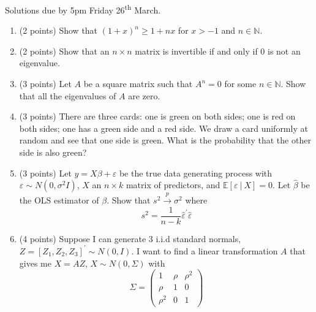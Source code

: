 \documentclass[12pt]{article}
\newif\ifsln
\newcommand{\N}{\mathbb{N}}
\renewcommand{\epsilon}{\varepsilon}
\newcommand{\E}{\mathbb{E}}
\begin{document}
\pagestyle{fancyplain}


\chead{\textbf{Take-home Problem Set \#2 \ifsln Solutions \fi}}

\begin{center}
Solutions due by 5pm Friday 26\textsuperscript{th} March.
\end{center}

\begin{enumerate}[1.]
\setlength\itemsep{5mm}
\item (2 points) Show that $(1 + x)^{n} \geq 1 + nx$ for $x> -1$ and $n \in \N$.

\item (2 points) Show that an $n \times n$ matrix is invertible if and only if 0 is not an eigenvalue.


\item (3 points) Let $A$ be a square matrix such that $A^{n} = 0$ for some $n \in \N$. Show that all the eigenvalues of $A$ are zero.
\item (3 points) There are three cards: one is green on both sides; one is red on both sides; one has a green side and a red side. We draw a card uniformly at random and see that one side is green. What is the probability that the other side is also green?


\item (3 points) Let $y = X\beta + \epsilon$ be the true data generating process with $\epsilon \sim N(0, \sigma^{2}I)$, $X$ an $n\times k$ matrix of predictors, and $\E[\epsilon \ | \ X] = 0$. Let $\hat{\beta}$ be the OLS estimator of $\beta$. Show that $s^2 \overset{p}{\to} \sigma^{2}$ where
\[s^{2} = \frac{1}{n-k} \hat{\epsilon}^{\prime}\hat{\epsilon}\]


\item (4 points) Suppose I can generate 3 i.i.d standard normals, $Z = [Z_{1}, Z_{2}, Z_{3}]^{\prime} \sim N(0, I)$. I want to find a linear transformation $A$ that gives me $X = A Z$, $X \sim N(0, \Sigma)$ with 
\[\Sigma = \begin{pmatrix} 1 & \rho & \rho^{2} \\ \rho & 1 & 0 \\ \rho^{2} & 0 & 1\end{pmatrix}\]


\end{enumerate}
\end{document}
